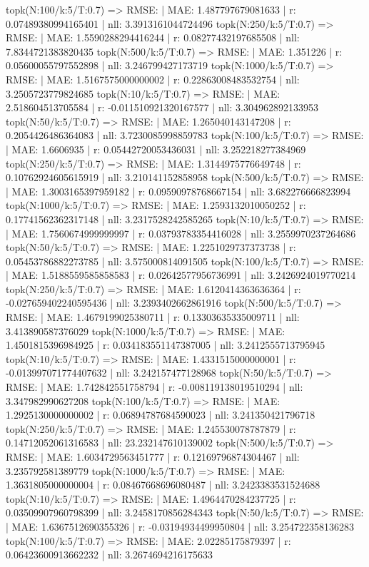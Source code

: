 topk(N:100/k:5/T:0.7) => RMSE: | MAE: 1.487797679081633 | r: 0.07489380994165401 | nll: 3.3913161044724496
topk(N:250/k:5/T:0.7) => RMSE: | MAE: 1.5590288294416244 | r: 0.08277432197685508 | nll: 7.8344721383820435
topk(N:500/k:5/T:0.7) => RMSE: | MAE: 1.351226 | r: 0.05600055797552898 | nll: 3.246799427173719
topk(N:1000/k:5/T:0.7) => RMSE: | MAE: 1.5167575000000002 | r: 0.22863008483532754 | nll: 3.2505723779824685
topk(N:10/k:5/T:0.7) => RMSE: | MAE: 2.518604513705584 | r: -0.011510921320167577 | nll: 3.304962892133953
topk(N:50/k:5/T:0.7) => RMSE: | MAE: 1.265040143147208 | r: 0.2054426486364083 | nll: 3.7230085998859783
topk(N:100/k:5/T:0.7) => RMSE: | MAE: 1.6606935 | r: 0.05442720053436031 | nll: 3.252218277384969
topk(N:250/k:5/T:0.7) => RMSE: | MAE: 1.3144975776649748 | r: 0.10762924605615919 | nll: 3.210141152858958
topk(N:500/k:5/T:0.7) => RMSE: | MAE: 1.3003165397959182 | r: 0.09590978768667154 | nll: 3.682276666823994
topk(N:1000/k:5/T:0.7) => RMSE: | MAE: 1.2593132010050252 | r: 0.17741562362317148 | nll: 3.2317528242585265
topk(N:10/k:5/T:0.7) => RMSE: | MAE: 1.7560674999999997 | r: 0.03793783354416028 | nll: 3.2559970237264686
topk(N:50/k:5/T:0.7) => RMSE: | MAE: 1.2251029737373738 | r: 0.05453786882273785 | nll: 3.575000814091505
topk(N:100/k:5/T:0.7) => RMSE: | MAE: 1.5188559585858583 | r: 0.02642577956736991 | nll: 3.2426924019770214
topk(N:250/k:5/T:0.7) => RMSE: | MAE: 1.6120414363636364 | r: -0.027659402240595436 | nll: 3.2393402662861916
topk(N:500/k:5/T:0.7) => RMSE: | MAE: 1.4679199025380711 | r: 0.13303635335009711 | nll: 3.413890587376029
topk(N:1000/k:5/T:0.7) => RMSE: | MAE: 1.4501815396984925 | r: 0.034183551147387005 | nll: 3.2412555713795945
topk(N:10/k:5/T:0.7) => RMSE: | MAE: 1.4331515000000001 | r: -0.013997071774407632 | nll: 3.242157477128968
topk(N:50/k:5/T:0.7) => RMSE: | MAE: 1.742842551758794 | r: -0.008119138019510294 | nll: 3.347982990627208
topk(N:100/k:5/T:0.7) => RMSE: | MAE: 1.2925130000000002 | r: 0.06894787684590023 | nll: 3.241350421796718
topk(N:250/k:5/T:0.7) => RMSE: | MAE: 1.245530078787879 | r: 0.14712052061316583 | nll: 23.232147610139002
topk(N:500/k:5/T:0.7) => RMSE: | MAE: 1.6034729563451777 | r: 0.12169796874304467 | nll: 3.235792581389779
topk(N:1000/k:5/T:0.7) => RMSE: | MAE: 1.3631805000000004 | r: 0.08467668696080487 | nll: 3.2423383531524688
topk(N:10/k:5/T:0.7) => RMSE: | MAE: 1.4964470284237725 | r: 0.03509907960798399 | nll: 3.2458170856284343
topk(N:50/k:5/T:0.7) => RMSE: | MAE: 1.6367512690355326 | r: -0.03194934499950804 | nll: 3.254722358136283
topk(N:100/k:5/T:0.7) => RMSE: | MAE: 2.02285175879397 | r: 0.06423600913662232 | nll: 3.2674694216175633
